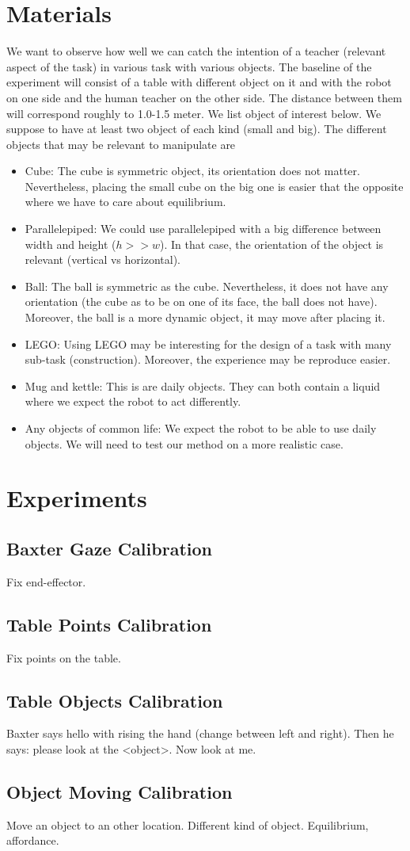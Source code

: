 \documentclass[11pt,a4paper]{article}
\begin{document}
\section{Materials}
We want to observe how well we can catch the intention of a teacher (relevant aspect of the task) in various task with various objects. The baseline of the experiment will consist of a table with different object on it and with the robot on one side and the human teacher on the other side. The distance between them will correspond roughly to 1.0-1.5 meter. We list object of interest below. We suppose to have at least two object of each kind (small and big). The different objects that may be relevant to manipulate are
\begin{itemize}
\item Cube: The cube is symmetric object, its orientation does not matter. Nevertheless, placing the small cube on the big one is easier that the opposite where we have to care about equilibrium.
\item Parallelepiped: We could use parallelepiped with a big difference between width and height ($h>>w$). In that case, the orientation of the object is relevant (vertical vs horizontal).
\item Ball: The ball is symmetric as the cube. Nevertheless, it does not have any orientation (the cube as to be on one of its face, the ball does not have). Moreover, the ball is a more dynamic object, it may move after placing it.
\item LEGO: Using LEGO may be interesting for the design of a task with many sub-task (construction). Moreover, the experience may be reproduce easier.
\item Mug and kettle: This is are daily objects. They can both contain a liquid where we expect the robot to act differently.
\item Any objects of common life: We expect the robot to be able to use daily objects. We will need to test our method on a more realistic case.
\end{itemize}

\section{Experiments}
\subsection{Baxter Gaze Calibration}
Fix end-effector.
\subsection{Table Points Calibration}
Fix points on the table.
\subsection{Table Objects Calibration}
Baxter says hello with rising the hand (change between left and right). Then he says: please look at the <object>. Now look at me.
\subsection{Object Moving Calibration}
Move an object to an other location. Different kind of object. Equilibrium, affordance.
\end{document}
